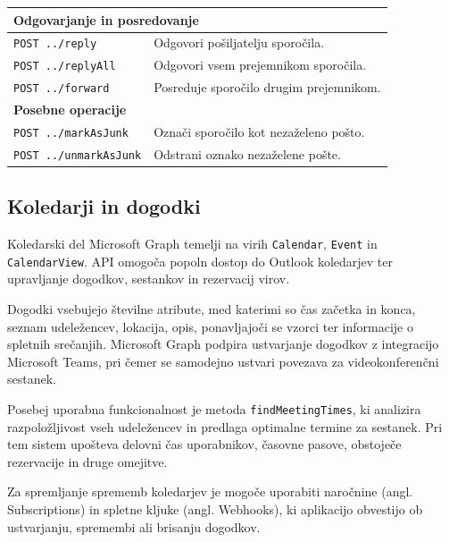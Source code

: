 \documentclass[a4paper, 12pt]{book}
\begin{document}
\begin{longtable}{|p{7cm}|p{7.5cm}|}
\multicolumn{2}{|l|}{\textbf{Odgovarjanje in posredovanje}} \\
\hline

\texttt{POST ../reply} &
Odgovori pošiljatelju sporočila. \\
\hline

\texttt{POST ../replyAll} &
Odgovori vsem prejemnikom sporočila. \\
\hline

\texttt{POST ../forward} &
Posreduje sporočilo drugim prejemnikom. \\
\hline

\multicolumn{2}{|l|}{\textbf{Posebne operacije}} \\
\hline

\texttt{POST ../markAsJunk} &
Označi sporočilo kot nezaželeno pošto. \\
\hline

\texttt{POST ../unmarkAsJunk} &
Odstrani oznako nezaželene pošte. \\
\hline

\end{longtable}


\subsection{Koledarji in dogodki}

Koledarski del Microsoft Graph temelji na virih \texttt{Calendar}, \texttt{Event} in \texttt{CalendarView}. API omogoča popoln dostop do Outlook koledarjev ter upravljanje dogodkov, sestankov in rezervacij virov.

Dogodki vsebujejo številne atribute, med katerimi so čas začetka in konca, seznam udeležencev, lokacija, opis, ponavljajoči se vzorci ter informacije o spletnih srečanjih. Microsoft Graph podpira ustvarjanje dogodkov z integracijo Microsoft Teams, pri čemer se samodejno ustvari povezava za videokonferenčni sestanek.

Posebej uporabna funkcionalnost je metoda \texttt{findMeetingTimes}, ki analizira razpoložljivost vseh udeležencev in predlaga optimalne termine za sestanek. Pri tem sistem upošteva delovni čas uporabnikov, časovne pasove, obstoječe rezervacije in druge omejitve.

Za spremljanje sprememb koledarjev je mogoče uporabiti naročnine (angl. Subscriptions) in spletne kljuke (angl. Webhooks), ki aplikacijo obvestijo ob ustvarjanju, spremembi ali brisanju dogodkov.
\end{document}
